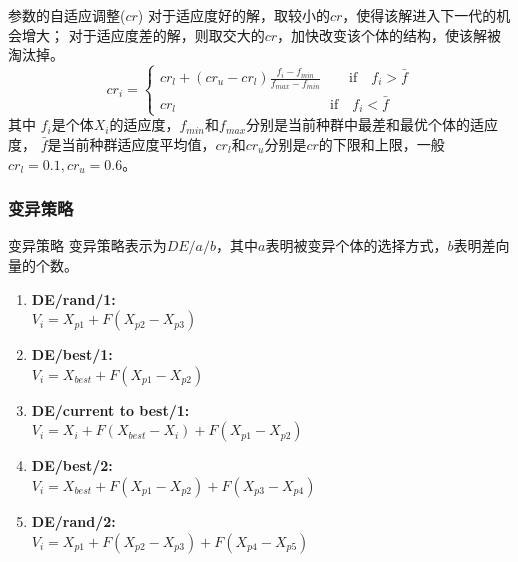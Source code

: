 \begin{frame}{参数的自适应调整($cr$)}
	对于适应度好的解，取较小的$cr$，使得该解进入下一代的机会增大；
	对于适应度差的解，则取交大的$cr$，加快改变该个体的结构，使该解被淘汰掉。
	$$
	cr_i =
	\begin{cases}
		cr_l+\left(cr_u-cr_l\right)\frac{f_i-f_{min}}{f_{max}-f_{min}}  \qquad \mathrm{if} \quad f_i>\bar{f} \\
		cr_l \qquad\qquad \qquad \qquad \qquad \quad \mathrm{if}\quad f_i<\bar{f}
	\end{cases}
	$$
	其中 $f_i$是个体$X_i$的适应度，$f_{min}$和$f_{max}$分别是当前种群中最差和最优个体的适应度，
	$\bar{f}$是当前种群适应度平均值，$cr_l$和$cr_u$分别是$cr$的下限和上限，一般$cr_l=0.1,cr_u=0.6$。
\end{frame}

\subsubsection{变异策略}
\begin{frame}{变异策略}
	变异策略表示为$DE/a/b$，其中$a$表明被变异个体的选择方式，$b$表明差向量的个数。
		\begin{enumerate}
		\item {\bf DE/rand/1:}\\\qquad$V_i = X_{p1}+F\left(X_{p2}-X_{p3}\right)$
		\item {\bf DE/best/1:}\\\qquad$V_i = X_{best}+F\left(X_{p1}-X_{p2}\right)$
		\item {\bf DE/current to best/1:}\\\qquad$V_i = X_{i}+F\left(X_{best}-X_{i}\right)+F\left(X_{p1}-X_{p2}\right)$
		\item {\bf DE/best/2:}\\\qquad$V_i=X_{best}+F\left(X_{p1}-X_{p2}\right)+F\left(X_{p3}-X_{p4}\right)$
		\item {\bf DE/rand/2:}\\\qquad$V_i = X_{p1}+F\left(X_{p2}-X_{p3}\right)+F\left(X_{p4}-X_{p5}\right)$
	\end{enumerate}
\end{frame}

% 